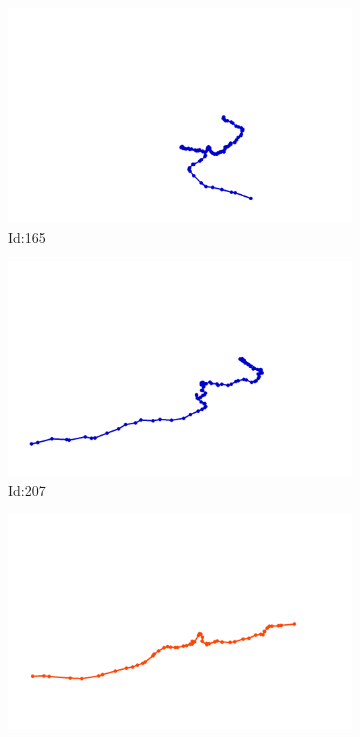 \documentclass[12pt,twoside]{report}
\begin{document}
\begin{figure}
\centering
\begin{subfigure}[b]{0.20\textwidth}
\centering
\includegraphics[width=\textwidth]{../../trajectories/165.png}
\caption{Id:165}
\end{subfigure}
\begin{subfigure}[b]{0.20\textwidth}
\centering
\includegraphics[width=\textwidth]{../../trajectories/207.png}
\caption{Id:207}
\end{subfigure}
\begin{subfigure}[b]{0.20\textwidth}
\centering
\includegraphics[width=\textwidth]{../../trajectories/251.png}

\end{subfigure}
\end{figure}
\end{document}
